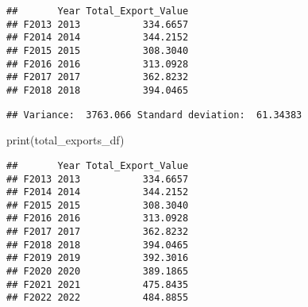 \documentclass[
]{article}
\newenvironment{Shaded}{\begin{snugshade}}{\end{snugshade}}
\newcommand{\FunctionTok}[1]{\textcolor[rgb]{0.00,0.00,0.00}{#1}}
\newcommand{\NormalTok}[1]{#1}
\newcommand{\OtherTok}[1]{\textcolor[rgb]{0.56,0.35,0.01}{#1}}
\newcommand{\SpecialCharTok}[1]{\textcolor[rgb]{0.00,0.00,0.00}{#1}}
\newcommand{\StringTok}[1]{\textcolor[rgb]{0.31,0.60,0.02}{#1}}
\begin{document}
\begin{verbatim}
##       Year Total_Export_Value
## F2013 2013           334.6657
## F2014 2014           344.2152
## F2015 2015           308.3040
## F2016 2016           313.0928
## F2017 2017           362.8232
## F2018 2018           394.0465
\end{verbatim}

\begin{Shaded}
\end{Shaded}

\begin{Shaded}
\end{Shaded}

\begin{verbatim}
## Variance:  3763.066 Standard deviation:  61.34383
\end{verbatim}

\begin{Shaded}
\begin{Highlighting}[]
\FunctionTok{print}\NormalTok{(total\_exports\_df)}
\end{Highlighting}
\end{Shaded}

\begin{verbatim}
##       Year Total_Export_Value
## F2013 2013           334.6657
## F2014 2014           344.2152
## F2015 2015           308.3040
## F2016 2016           313.0928
## F2017 2017           362.8232
## F2018 2018           394.0465
## F2019 2019           392.3016
## F2020 2020           389.1865
## F2021 2021           475.8435
## F2022 2022           484.8855
\end{verbatim}
\end{document}
